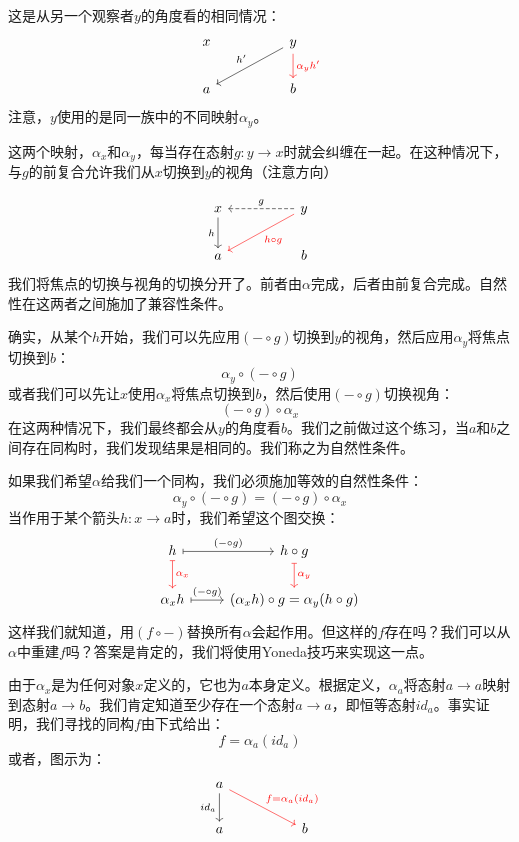 \documentclass[DaoFP]{subfiles}
\begin{document}
这是从另一个观察者$y$的角度看的相同情况：
\[
 \begin{tikzcd}
 x
  && y
 \arrow[lld, "h'"']
 \arrow[d, red, "\alpha_y h'"]
 \\
 a
  && b
 \end{tikzcd}
\]
注意，$y$使用的是同一族中的不同映射$\alpha_y$。

这两个映射，$\alpha_x$和$\alpha_y$，每当存在态射$g \colon y \to x$时就会纠缠在一起。在这种情况下，与$g$的前复合允许我们从$x$切换到$y$的视角（注意方向）

\[
 \begin{tikzcd}
 x
 \arrow[d, "h"']
 && y
 \arrow[ll, dashed, "g"']
 \arrow[lld, red, "h \circ g"]
 \\
 a
  && b
 \end{tikzcd}
\]
我们将焦点的切换与视角的切换分开了。前者由$\alpha$完成，后者由前复合完成。自然性在这两者之间施加了兼容性条件。

确实，从某个$h$开始，我们可以先应用$(- \circ g)$切换到$y$的视角，然后应用$\alpha_y$将焦点切换到$b$：
\[ \alpha_y \circ (- \circ g) \]
或者我们可以先让$x$使用$\alpha_x$将焦点切换到$b$，然后使用$(- \circ g)$切换视角：
\[ (- \circ g) \circ \alpha_x \]
在这两种情况下，我们最终都会从$y$的角度看$b$。我们之前做过这个练习，当$a$和$b$之间存在同构时，我们发现结果是相同的。我们称之为自然性条件。

如果我们希望$\alpha$给我们一个同构，我们必须施加等效的自然性条件：
\[ \alpha_y \circ (- \circ g) = (- \circ g) \circ \alpha_x \]
当作用于某个箭头$h \colon x \to a$时，我们希望这个图交换：
\[
 \begin{tikzcd}
 h
 \arrow[r, mapsto, "(- \circ g)"]
 \arrow[d, mapsto, red, "\alpha_x"]
 & h \circ g
 \arrow[d, mapsto, red, "\alpha_y"]
 \\
 \alpha_x h
 \arrow[r, mapsto, "(- \circ g)"]
&(\alpha_x h) \circ g = \alpha_y (h \circ g)
 \end{tikzcd}
\]
这样我们就知道，用$(f \circ -)$替换所有$\alpha$会起作用。但这样的$f$存在吗？我们可以从$\alpha$中重建$f$吗？答案是肯定的，我们将使用Yoneda技巧来实现这一点。

由于$\alpha_x$是为任何对象$x$定义的，它也为$a$本身定义。根据定义，$\alpha_a$将态射$a \to a$映射到态射$a \to b$。我们肯定知道至少存在一个态射$a \to a$，即恒等态射$id_a$。事实证明，我们寻找的同构$f$由下式给出：
\[f = \alpha_a (id_a)\]
或者，图示为：
\[
 \begin{tikzcd}
a
 \arrow[d, "id_a"']
 \arrow[rrd, red, "f = \alpha_a (id_a)"]
  \\
 a
  && b
 \end{tikzcd}
\]
\end{document}
